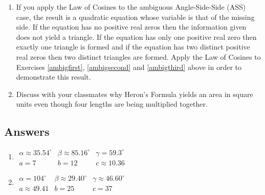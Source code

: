 \begin{enumerate}
\begin{center}
\end{center}


\item If you apply the Law of Cosines to the ambiguous Angle-Side-Side (ASS) case, the result is a quadratic equation whose variable is that of the missing side. If the equation has no positive real zeros then the information given does not yield a triangle.  If the equation has only one positive real zero then exactly one triangle is formed and if the equation has two distinct positive real zeros then two distinct triangles are formed.  Apply the Law of Cosines to Exercises \ref{ambigfirst}, \ref{ambigsecond} and \ref{ambigthird} above in order to demonstrate this result.  

\item Discuss with your classmates why Heron's Formula yields an area in square units even though four lengths are being multiplied together.

\end{enumerate}

\newpage

\subsection{Answers}

\begin{multicols}{2}

\begin{enumerate}

\item $\begin{array}{lll}
\alpha \approx 35.54^{\circ} & \beta \approx 85.16^{\circ} & \gamma = 59.3^{\circ} \\
a = 7 & b = 12 & c \approx 10.36 \end{array}$

\item $\begin{array}{lll}
\alpha = 104^{\circ} & \beta \approx 29.40^{\circ} & \gamma \approx 46.60^{\circ} \\
a \approx 49.41 & b = 25 & c = 37 \end{array}$

\setcounter{HW}{\value{enumi}}

\end{enumerate}

\end{multicols}

